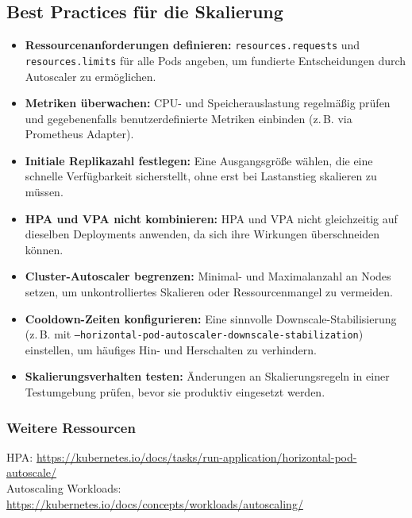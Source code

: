 \subsection{Best Practices für die Skalierung}
\begin{itemize}
  \item \textbf{Ressourcenanforderungen definieren:} \texttt{resources.requests} und \texttt{resources.limits} für alle Pods angeben, um fundierte Entscheidungen durch Autoscaler zu ermöglichen.

  \item \textbf{Metriken überwachen:} CPU- und Speicherauslastung regelmäßig prüfen und gegebenenfalls benutzerdefinierte Metriken einbinden (z.\,B. via Prometheus Adapter).

  \item \textbf{Initiale Replikazahl festlegen:} Eine Ausgangsgröße wählen, die eine schnelle Verfügbarkeit sicherstellt, ohne erst bei Lastanstieg skalieren zu müssen.

  \item \textbf{HPA und VPA nicht kombinieren:} HPA und VPA nicht gleichzeitig auf dieselben Deployments anwenden, da sich ihre Wirkungen überschneiden können.

  \item \textbf{Cluster-Autoscaler begrenzen:} Minimal- und Maximalanzahl an Nodes setzen, um unkontrolliertes Skalieren oder Ressourcenmangel zu vermeiden.

  \item \textbf{Cooldown-Zeiten konfigurieren:} Eine sinnvolle Downscale-Stabilisierung (z.\,B. mit \texttt{--horizontal-pod-autoscaler-downscale-stabilization}) einstellen, um häufiges Hin- und Herschalten zu verhindern.

  \item \textbf{Skalierungsverhalten testen:} Änderungen an Skalierungsregeln in einer Testumgebung prüfen, bevor sie produktiv eingesetzt werden.
\end{itemize}

\subsubsection*{Weitere Ressourcen}
HPA:  
\url{https://kubernetes.io/docs/tasks/run-application/horizontal-pod-autoscale/}\\
Autoscaling Workloads: \url{https://kubernetes.io/docs/concepts/workloads/autoscaling/}
